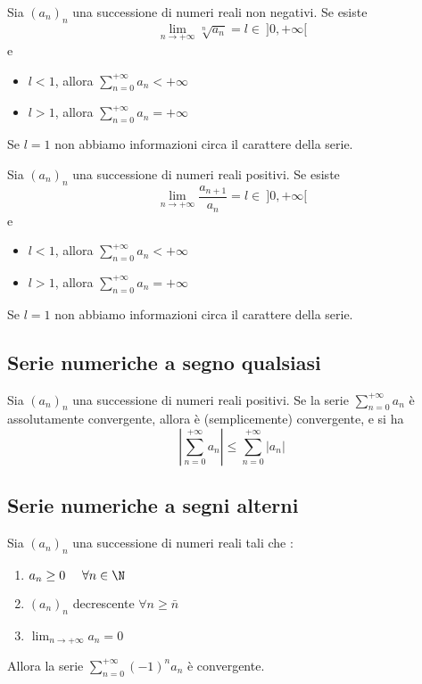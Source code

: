 \begin{shadedTheorem}
    Sia $(a_n)_n$ una successione di numeri reali non negativi. Se esiste 
    \[\lim_{n\to +\infty }\sqrt[n]{a_n}=l\in \:]0,+\infty[\]
    e 
    \begin{itemize}
        \item $l<1$, allora $\sum_{n=0}^{+\infty}a_n<+\infty$
        \item $l>1$, allora $\sum_{n=0}^{+\infty}a_n=+\infty$
    \end{itemize}
\end{shadedTheorem}
Se $l=1$ non abbiamo informazioni circa il carattere della serie.
\begin{shadedTheorem}
    Sia $(a_n)_n$ una successione di numeri reali positivi. Se esiste 
    \[\lim_{n\to +\infty }\frac{a_{n+1}}{a_n}=l\in \:]0,+\infty[\]
    e 
    \begin{itemize}
        \item $l<1$, allora $\sum_{n=0}^{+\infty}a_n<+\infty$
        \item $l>1$, allora $\sum_{n=0}^{+\infty}a_n=+\infty$
    \end{itemize}
\end{shadedTheorem}
Se $l=1$ non abbiamo informazioni circa il carattere della serie.
\subsection{Serie numeriche a segno qualsiasi}
\begin{shadedTheorem}
    Sia $(a_n)_n$ una successione di numeri reali positivi. Se la serie $\sum_{n=0}^{+\infty}a_n$ è assolutamente convergente, allora è (semplicemente) convergente, e si ha 
    \[\left|\sum_{n=0}^{+\infty}a_n\right|\leq \sum_{n=0}^{+\infty}\left|a_n\right|\]
\end{shadedTheorem}
\subsection{Serie numeriche a segni alterni}
\begin{shadedTheorem}
    Sia $(a_n)_n$ una successione di numeri reali tali che :
    \begin{enumerate}[label=\roman*\:\textnormal{)},itemindent=*]
        \item $a_n\geq 0 ~~~~\forall n\in \N$
        \item $(a_n)_n$ decrescente $\forall n\geq\bar n$
        \item $\lim_{n\to +\infty} a_n=0$
    \end{enumerate}
    Allora la serie $\sum_{n=0}^{+\infty}(-1)^na_n$ è convergente.
\end{shadedTheorem}

